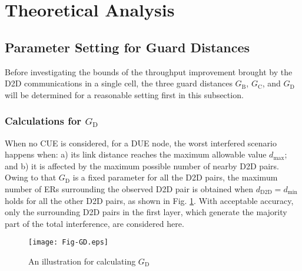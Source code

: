 \documentclass[journal, 10pt]{IEEEtran}
\begin{document}
\section{Theoretical Analysis}\label{sec:ana}

\subsection{Parameter Setting for Guard Distances}
Before investigating the bounds of the throughput improvement brought
by the D2D communications in a single cell, the three guard distances
$G_\mathrm{B}$, $G_\mathrm{C}$, and $G_\mathrm{D}$ will be determined
for a reasonable setting first in this subsection. 

\subsubsection{Calculations for $G_\mathrm{D}$}
When no CUE is considered, for a DUE node, the worst interfered
scenario happens when: a) its link distance reaches the maximum
allowable value $d_{\max}$; and b) it is affected by the maximum
possible number of nearby D2D pairs. Owing to that $G_\mathrm{D}$ is a
fixed parameter for all the D2D pairs, the maximum number of ERs
surrounding the observed D2D pair is obtained when $d_\mathrm{D2D} =
d_{\min}$ holds for all the other D2D pairs, as shown in Fig.
\ref{fig:GD}. With acceptable accuracy, only the surrounding D2D pairs
in the first layer, which generate the majority part of the total
interference, are considered here. 
\begin{figure}[!h]
\centering
\texttt{[image: Fig-GD.eps]} \caption{An illustration for calculating $G_\mathrm{D}$} \label{fig:GD}
\end{figure}
\end{document}

